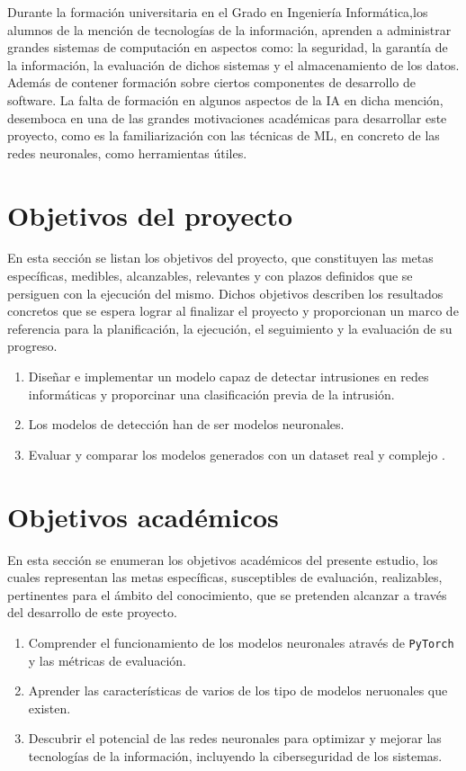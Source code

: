 Durante la formación universitaria en el Grado en Ingeniería Informática,los alumnos
de la mención de tecnologías de la información, aprenden a administrar grandes sistemas de computación en aspectos como: la seguridad, la garantía de la información, la evaluación de dichos sistemas y el almacenamiento de los datos. Además de contener formación sobre ciertos componentes de desarrollo de software. La falta de formación en algunos aspectos de la IA en dicha mención, desemboca en una de las grandes motivaciones académicas para desarrollar este proyecto, como es la familiarización con las técnicas de ML, en concreto de las redes neuronales, como herramientas útiles.

 
\section{Objetivos del proyecto} \label{sec.objetivos-pro}
En esta sección se listan los objetivos del proyecto, que constituyen las metas específicas, medibles, alcanzables, relevantes y con plazos definidos que se persiguen con la ejecución del mismo. Dichos objetivos describen los resultados concretos que se espera lograr al finalizar el proyecto y proporcionan un marco de referencia para la planificación, la ejecución, el seguimiento y la evaluación de su progreso.

\begin{enumerate}
	\item Diseñar e implementar un modelo capaz de detectar intrusiones en redes informáticas y proporcinar una clasificación previa de la intrusión.
	\item Los modelos de detección han de ser modelos neuronales.
	\item Evaluar y comparar los modelos generados con un dataset real y complejo .
\end{enumerate}

\section{Objetivos académicos} \label{sec.objetivos-aca}
En esta sección se enumeran los objetivos académicos del presente estudio, los cuales representan las metas específicas, susceptibles de evaluación, realizables, pertinentes para el ámbito del conocimiento, que se pretenden alcanzar a través del desarrollo de este proyecto. 

\begin{enumerate}
	\item Comprender el funcionamiento de los modelos neuronales através de \texttt{PyTorch} y las métricas de evaluación.
	\item Aprender las características de varios de los tipo de modelos neruonales que existen.
	\item Descubrir el potencial de las redes neuronales para optimizar y mejorar las tecnologías de la información, incluyendo la ciberseguridad de los sistemas.

\end{enumerate}


